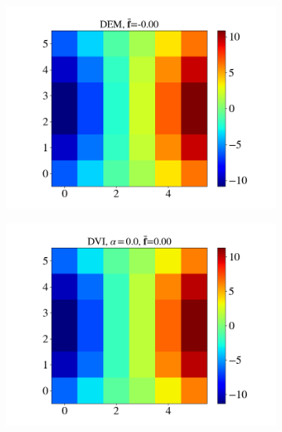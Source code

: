 \begin{itemize}
	\begin{figure}[H]
		\centering	
		\begin{subfigure}{0.32\columnwidth}	
			\centering
			\includegraphics[width=1.0\textwidth]{images/CD/Example7/5/T2_6_DEM_0.png}
		\end{subfigure}
		\begin{subfigure}{0.32\columnwidth}	
			\centering
			\includegraphics[width=1.0\textwidth]{images/CD/Example7/5/T2_6_DVI_0.0.png}
		\end{subfigure}
		\begin{subfigure}{0.32\columnwidth}	
			\centering

\end{subfigure}
\end{figure}
\end{itemize}
